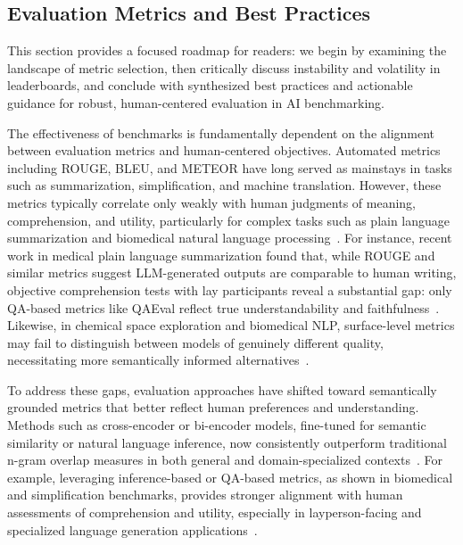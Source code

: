 \documentclass[sigconf]{acmart}
\begin{document}
\subsection{Evaluation Metrics and Best Practices}

This section provides a focused roadmap for readers: we begin by examining the landscape of metric selection, then critically discuss instability and volatility in leaderboards, and conclude with synthesized best practices and actionable guidance for robust, human-centered evaluation in AI benchmarking.

The effectiveness of benchmarks is fundamentally dependent on the alignment between evaluation metrics and human-centered objectives. Automated metrics including ROUGE, BLEU, and METEOR have long served as mainstays in tasks such as summarization, simplification, and machine translation. However, these metrics typically correlate only weakly with human judgments of meaning, comprehension, and utility, particularly for complex tasks such as plain language summarization and biomedical natural language processing~\cite{ref76,ref81,ref91,ref94,ref101,ref104,ref106}. For instance, recent work in medical plain language summarization found that, while ROUGE and similar metrics suggest LLM-generated outputs are comparable to human writing, objective comprehension tests with lay participants reveal a substantial gap: only QA-based metrics like QAEval reflect true understandability and faithfulness~\cite{ref81}. Likewise, in chemical space exploration and biomedical NLP, surface-level metrics may fail to distinguish between models of genuinely different quality, necessitating more semantically informed alternatives~\cite{ref91,ref94}.

To address these gaps, evaluation approaches have shifted toward semantically grounded metrics that better reflect human preferences and understanding. Methods such as cross-encoder or bi-encoder models, fine-tuned for semantic similarity or natural language inference, now consistently outperform traditional n-gram overlap measures in both general and domain-specialized contexts~\cite{ref76,ref91,ref94}. For example, leveraging inference-based or QA-based metrics, as shown in biomedical and simplification benchmarks, provides stronger alignment with human assessments of comprehension and utility, especially in layperson-facing and specialized language generation applications~\cite{ref76,ref81,ref94,ref106}.
\end{document}
